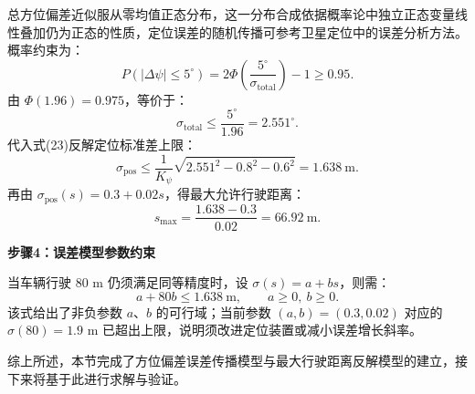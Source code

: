总方位偏差近似服从零均值正态分布，这一分布合成依据概率论中独立正态变量线性叠加仍为正态的性质\cite{sheng2008gailv,liu2014suiji}，定位误差的随机传播可参考卫星定位中的误差分析方法\cite{xie2009gps}。概率约束为：
\begin{equation}
    P(\lvert\Delta\psi\rvert\le 5^\circ)=2\Phi\!\left(\frac{5^\circ}{\sigma_{\mathrm{total}}}\right)-1\ge 0.95 .
\end{equation}
由 $\Phi(1.96)=0.975$，等价于：
\begin{equation}
    \sigma_{\mathrm{total}}\le \frac{5^\circ}{1.96}=2.551^\circ .
\end{equation}
代入式(23)反解定位标准差上限：
\begin{equation}
    \sigma_{\mathrm{pos}}\le \frac{1}{K_\psi}\sqrt{2.551^2-0.8^2-0.6^2}=1.638\ \text{m}.
\end{equation}
再由 $\sigma_{\mathrm{pos}}(s)=0.3+0.02s$，得最大允许行驶距离：
\begin{equation}
    s_{\max}=\frac{1.638-0.3}{0.02}=66.92\ \text{m}.
\end{equation}

\textbf{步骤4：误差模型参数约束}

当车辆行驶 80 m 仍须满足同等精度时，设 $\sigma(s)=a+bs$，则需：
\begin{equation}
    a+80b\le 1.638\ \text{m}, \qquad a\ge 0,\ b\ge 0 .
\end{equation}
该式给出了非负参数 $a$、$b$ 的可行域；当前参数 $(a,b)=(0.3,0.02)$ 对应的 $\sigma(80)=1.9$ m 已超出上限，说明须改进定位装置或减小误差增长斜率。

综上所述，本节完成了方位偏差误差传播模型与最大行驶距离反解模型的建立，接下来将基于此进行求解与验证。
